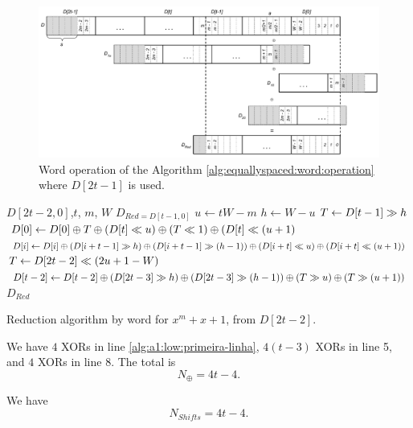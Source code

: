 \begin{figure}[htb]
  \centering
  \includegraphics[width = \columnwidth]{figures/reduction-equally-spaced.pdf}
\caption{Word operation of the Algorithm \ref{alg:equallyspaced:word:operation} where $D[2t-1]$ is used.}
\label{fig:word:operation:alg:a1:low2}
\end{figure}

\begin{algorithm}
  \begin{algorithmic}[1]
  \REQUIRE $D[2t-2,0]$,$t$, $m$, $W$
  \ENSURE $D_{Red = D[t-1,0]}$
  \STATE $u \gets tW - m$
  \STATE $h \gets W - u$
  \STATE $T \gets D[t-1] \gg h$
  \STATE $D[0] \gets D[0] \oplus T \oplus (D[t] \ll u) \oplus (T \ll 1) \oplus (D[t] \ll (u+1)$ \label{alg:a1:low:primeira-linha}
    \STATE $D[i] \gets D[i] \oplus (D[i+t-1] \gg h) \oplus (D[i+t-1] \gg (h-1)) \oplus (D[i+t] \ll u) \oplus (D[i+t] \ll (u+1))$
    \ENDFOR
  \STATE $T \gets D[2t-2] \ll (2u+1-W)$\ 
  \STATE $D[t-2] \gets D[t-2] \oplus (D[2t-3] \gg h) \oplus (D[2t-3] \gg (h-1)) \oplus (T \gg u) \oplus (T \gg (u+1))$
  \RETURN $D_{Red}$
  \caption{Reduction algorithm by word for $x^m + x + 1$, from $D[2t-2]$.}
  \label{alg:word:a1:low}
\end{algorithmic}
\end{algorithm}

We have $4$ XORs in line \ref{alg:a1:low:primeira-linha}, $4(t-3)$ XORs in line 5, and $4$ XORs in line 8. The total is $$N_\oplus = 4t-4.$$

We have $$N_{Shifts} = 4t-4.$$

